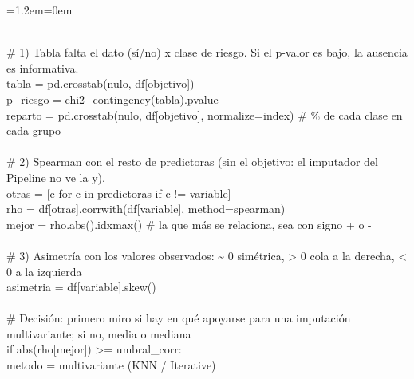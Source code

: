 \documentclass[11pt,a4paper]{article}
\newenvironment{codigo}
  {\par\smallskip\begin{list}{}{\leftmargin=1.2em\rightmargin=0em}\item\relax\ttfamily\scriptsize\raggedright}
  {\end{list}\smallskip}
\begin{document}
{\begin{codigo}
\mbox{} \\{}
\hspace*{2.08em}\# 1) Tabla \textquotedbl{}falta el dato (sí/\allowbreak{}no)\textquotedbl{} x clase de riesgo. Si el p-valor es bajo, la ausencia es informativa. \\{}
\hspace*{2.08em}tabla = pd.crosstab(nulo, df[objetivo]) \\{}
\hspace*{2.08em}p\_\allowbreak{}riesgo = chi2\_\allowbreak{}contingency(tabla).pvalue \\{}
\hspace*{2.08em}reparto = pd.crosstab(nulo, df[objetivo], normalize=\textquotedbl{}index\textquotedbl{})   \# \% de cada clase en cada grupo \\{}
\mbox{} \\{}
\hspace*{2.08em}\# 2) Spearman con el resto de predictoras (sin el objetivo: el imputador del Pipeline no ve la y). \\{}
\hspace*{2.08em}otras = [c for c in predictoras if c != variable] \\{}
\hspace*{2.08em}rho = df[otras].corrwith(df[variable], method=\textquotedbl{}spearman\textquotedbl{}) \\{}
\hspace*{2.08em}mejor = rho.abs().idxmax()              \# la que más se relaciona, sea con signo + o - \\{}
\mbox{} \\{}
\hspace*{2.08em}\# 3) Asimetría con los valores observados: \textasciitilde{} 0 simétrica, \textgreater{} 0 cola a la derecha, \textless{} 0 a la izquierda \\{}
\hspace*{2.08em}asimetria = df[variable].skew() \\{}
\mbox{} \\{}
\hspace*{2.08em}\# Decisión: primero miro si hay en qué apoyarse para una imputación multivariante; si no, media o mediana \\{}
\hspace*{2.08em}if abs(rho[mejor]) \textgreater{}= umbral\_\allowbreak{}corr: \\{}
\hspace*{4.16em}metodo = \textquotedbl{}multivariante (KNN /\allowbreak{} Iterative)\textquotedbl{} \\{}

\end{codigo}}
\end{document}
